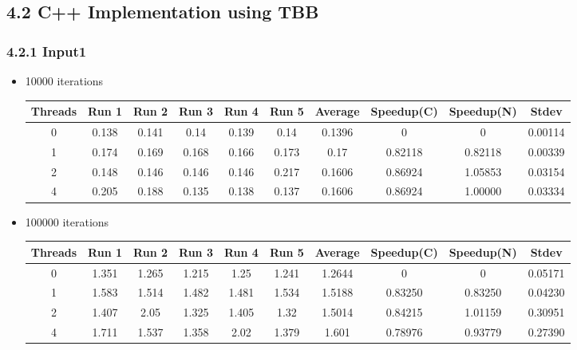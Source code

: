 \documentclass{article}
\begin{document}
\subsection*{4.2 C++ Implementation using TBB}
\subsubsection*{4.2.1 Input1} 
 \begin{itemize}
\item 10000 iterations
\begin{center}
 \begin{adjustbox}{width=\columnwidth, center} 
 \begin{tabular}{ | |c | c c c c c | c | c c | c | |} \hline 
 Threads & Run 1 & Run 2 & Run 3 & Run 4 & Run 5 & Average & Speedup(C) & Speedup(N) & Stdev \\ [0.5ex] 
 \hline 
 \hline 
0& 0.138 & 0.141 & 0.14 & 0.139 & 0.14 & 0.1396 & 0 & 0 & 0.00114\\ 
 \hline
1& 0.174 & 0.169 & 0.168 & 0.166 & 0.173 & 0.17 & 0.82118 & 0.82118 & 0.00339\\ 
 \hline
2& 0.148 & 0.146 & 0.146 & 0.146 & 0.217 & 0.1606 & 0.86924 & 1.05853 & 0.03154\\ 
 \hline
4& 0.205 & 0.188 & 0.135 & 0.138 & 0.137 & 0.1606 & 0.86924 & 1.00000 & 0.03334\\ 
 \hline
\end{tabular} 
 \end{adjustbox} 
 \end{center} 
\item 100000 iterations
\begin{center}
 \begin{adjustbox}{width=\columnwidth, center} 
 \begin{tabular}{ | |c | c c c c c | c | c c | c | |} \hline 
 Threads & Run 1 & Run 2 & Run 3 & Run 4 & Run 5 & Average & Speedup(C) & Speedup(N) & Stdev \\ [0.5ex] 
 \hline 
 \hline 
0& 1.351 & 1.265 & 1.215 & 1.25 & 1.241 & 1.2644 & 0 & 0 & 0.05171\\ 
 \hline
1& 1.583 & 1.514 & 1.482 & 1.481 & 1.534 & 1.5188 & 0.83250 & 0.83250 & 0.04230\\ 
 \hline
2& 1.407 & 2.05 & 1.325 & 1.405 & 1.32 & 1.5014 & 0.84215 & 1.01159 & 0.30951\\ 
 \hline
4& 1.711 & 1.537 & 1.358 & 2.02 & 1.379 & 1.601 & 0.78976 & 0.93779 & 0.27390\\ 
 \hline
\end{tabular} 
 \end{adjustbox} 
 \end{center} 
\end{itemize}
\end{document}
